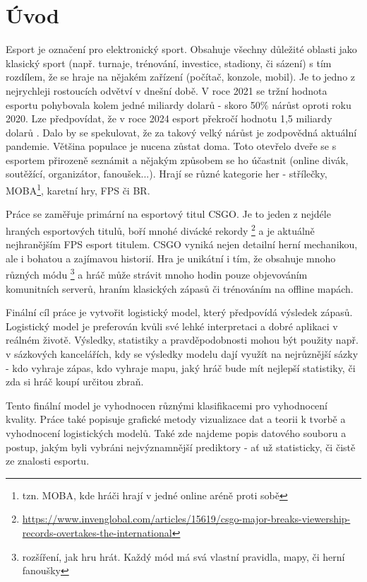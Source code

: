 \chapter{Úvod}
Esport je označení pro elektronický sport. Obsahuje všechny důležité oblasti jako klasický sport (např. turnaje, trénování, investice, stadiony, či sázení)
s tím rozdílem, že se hraje na nějakém zařízení (počítač, konzole, mobil).
Je to jedno z nejrychleji rostoucích odvětví v dnešní době. V roce 2021 se tržní hodnota esportu pohybovala kolem jedné miliardy dolarů - skoro
50\% nárůst oproti roku 2020. Lze předpovídat, že v roce 2024 esport překročí hodnotu 1,5 miliardy dolarů \cite{Gough2021}.
Dalo by se spekulovat, že za takový velký nárůst je zodpovědná aktuální pandemie. Většina populace je nucena zůstat doma. Toto otevřelo dveře
se s esportem přirozeně seznámit a nějakým způsobem se ho účastnit (online divák, soutěžící, organizátor, fanoušek...). 
Hrají se různé kategorie her - střílečky, \ac{MOBA}\footnote{tzn. MOBA, kde hráči hrají v jedné online aréně proti sobě}, karetní hry, \ac{FPS} či \ac{BR}.

Práce se zaměřuje primární na esportový titul \acf{CSGO}. Je to jeden z nejdéle hraných esportových titulů, boří mnohé divácké rekordy
\footnote{\url{https://www.invenglobal.com/articles/15619/csgo-major-breaks-viewership-records-overtakes-the-international}}
a je aktuálně nejhranějším \ac{FPS} esport titulem. \ac{CSGO} vyniká nejen detailní herní mechanikou, ale i bohatou a zajímavou historií. Hra
je unikátní i tím, že obsahuje mnoho různých módu \footnote{rozšíření, jak hru hrát. Každý mód má svá vlastní pravidla, mapy, či herní fanoušky}
a hráč může strávit mnoho hodin pouze objevováním komunitních serverů, hraním klasických zápasů či trénováním na offline mapách.

Finální cíl práce je vytvořit logistický model, který předpovídá výsledek zápasů. Logistický model je preferován kvůli své lehké interpretaci a 
dobré aplikaci v reálném životě. Výsledky, statistiky a pravděpodobnosti mohou být použity např. v sázkových kancelářích, kdy se výsledky modelu
dají využít na nejrůznější sázky - kdo vyhraje zápas, kdo vyhraje mapu, jaký hráč bude mít nejlepší statistiky, či zda si hráč koupí určitou zbraň.

Tento finální model je vyhodnocen různými klasifikacemi pro vyhodnocení kvality.
Práce také popisuje grafické metody vizualizace dat a teorii k tvorbě a vyhodnocení logistických modelů. Také zde najdeme popis datového souboru a postup,
jakým byli vybráni nejvýznamnější prediktory - ať už statisticky, či čistě ze znalosti esportu. 
